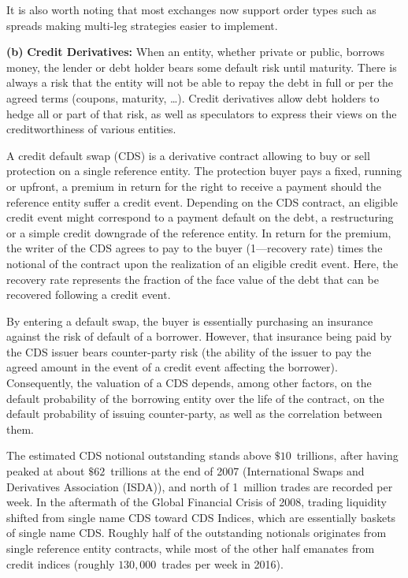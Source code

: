 It is also worth noting that most exchanges now support order types such as spreads making multi-leg strategies easier to implement. \twomedskip


\noindent\textbf{(b)} \textbf{Credit Derivatives:} When an entity, whether private or public, borrows money, the lender or debt holder bears some default risk until maturity. There is always a risk that the entity will not be able to repay the debt in full or per the agreed terms (coupons, maturity, \dots). Credit derivatives allow debt holders to hedge all or part of that risk, as well as speculators to express their views on the creditworthiness of various entities. 


A credit default swap (CDS) is a derivative contract allowing to buy or sell protection on a single reference entity. The protection buyer pays a fixed, running or upfront, a premium in return for the right to receive a payment should the reference entity suffer a credit event. Depending on the CDS contract, an eligible credit event might correspond to a payment default on the debt, a restructuring or a simple credit downgrade of the reference entity. In return for the premium, the writer of the CDS agrees to pay to the buyer (1---recovery rate) times the notional of the contract upon the realization of an eligible credit event. Here, the recovery rate represents the fraction of the face value of the debt that can be recovered following a credit event.


By entering a default swap, the buyer is essentially purchasing an insurance against the risk of default of a borrower. However, that insurance being paid by the CDS issuer bears counter-party risk (the ability of the issuer to pay the agreed amount in the event of a credit event affecting the borrower). Consequently, the valuation of a CDS depends, among other factors, on the default probability of the borrowing entity over the life of the contract, on the default probability of issuing counter-party, as well as the correlation between them.


The estimated CDS notional outstanding stands above $\$10$~trillions, after having peaked at about $\$62$~trillions at the end of 2007 (International Swaps and Derivatives Association (ISDA)), and north of 1~million trades are recorded per week. In the aftermath of the Global Financial Crisis of 2008, trading liquidity shifted from single name CDS toward CDS Indices, which are essentially baskets of single name CDS. Roughly half of the outstanding notionals originates from single reference entity contracts, while most of the other half emanates from credit indices (roughly $130,000$~trades per week in 2016).


